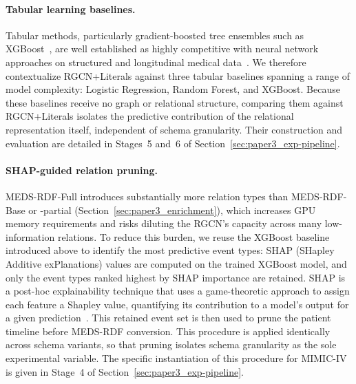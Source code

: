 \paragraph{Tabular learning baselines.}
Tabular methods, particularly gradient-boosted tree ensembles such as XGBoost~\cite{Chen_2016}, are well established as highly competitive with neural network approaches on structured and longitudinal medical data~\cite{oufattole_meds-tab_2024}. We therefore contextualize RGCN+Literals against three tabular baselines spanning a range of model complexity: Logistic Regression, Random Forest, and XGBoost. Because these baselines receive no graph or relational structure, comparing them against RGCN+Literals isolates the predictive contribution of the relational representation itself, independent of schema granularity. Their construction and evaluation are detailed in Stages~5 and~6 of Section~\ref{sec:paper3_exp-pipeline}.

\paragraph{SHAP-guided relation pruning.}
MEDS-RDF-Full introduces substantially more relation types than MEDS-RDF-Base or -partial (Section~\ref{sec:paper3_enrichment}), which increases GPU memory requirements and risks diluting the RGCN's capacity across many low-information relations. To reduce this burden, we reuse the XGBoost baseline\cite{xu_aces_2025} introduced above to identify the most predictive event types: SHAP (SHapley Additive exPlanations) values are computed on the trained XGBoost model, and only the event types ranked highest by SHAP importance are retained. SHAP is a post-hoc explainability technique that uses a game-theoretic approach to assign each feature a Shapley value, quantifying its contribution to a model's output for a given prediction~\cite{nohara_explanation_2021}. This retained event set is then used to prune the patient timeline before MEDS-RDF conversion. This procedure is applied identically across schema variants, so that pruning isolates schema granularity as the sole experimental variable. The specific instantiation of this procedure for MIMIC-IV is given in Stage~4 of Section~\ref{sec:paper3_exp-pipeline}.

